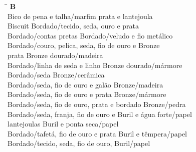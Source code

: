 \begin{tabbing}
	\hspace{8,7cm}\=\hspace{1cm}\=\kill
	\textbf{B} \>  \\ 
	Bico de pena e talha/marfim	\> prata e lantejoula\\
	Biscuit \> Bordado/tecido, seda, ouro e prata\\
	Bordado/contas pretas \> Bordado/veludo e fio metálico\\
	Bordado/couro, pelica, seda, fio de ouro e \> Bronze\\ 
	prata \>  Bronze dourado/madeira\\ 
	Bordado/linha de seda e linho \> Bronze dourado/mármore\\ 
	Bordado/seda \> Bronze/cerâmica\\
	Bordado/seda, fio de ouro e galão \> Bronze/madeira \\
	Bordado/seda, fio de ouro e prata \> Bronze/mármore \\ 
	Bordado/seda, fio de ouro, prata e bordado	\> Bronze/pedra \\ 
	Bordado/seda, franja, fio de ouro e \> Buril e água forte/papel\\
	lantejoulas  \> Buril e ponta seca/papel\\
	Bordado/tafetá, fio de ouro e prata  \> Buril e têmpera/papel\\
	Bordado/tecido, seda, fio de ouro,  \> Buril/papel\\	   
\end{tabbing}

